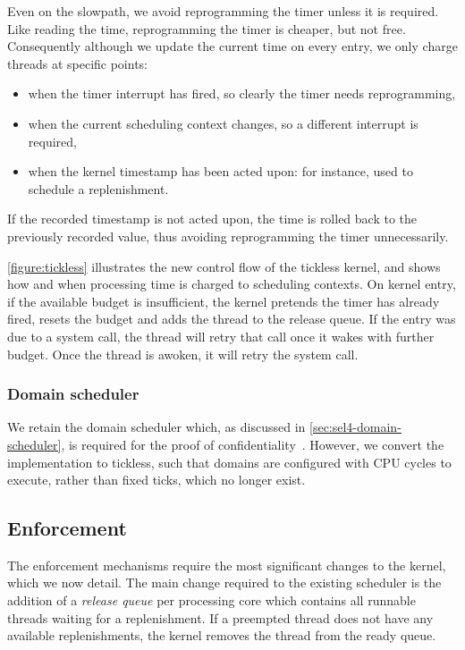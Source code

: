 Even on the slowpath, we avoid reprogramming the timer unless it is required. Like reading the time, 
reprogramming the timer is cheaper, but not free. Consequently although we update the current time
on every entry, we only charge threads at specific points:
\begin{itemize}
\item when the timer interrupt has fired, so clearly the timer needs reprogramming,
\item when the current scheduling context changes, so a different interrupt is required,
\item when the kernel timestamp has been acted upon: for instance, used to schedule a
    replenishment.
\end{itemize}
If the recorded timestamp is not acted upon, the time is rolled back to the previously recorded value,
thus avoiding reprogramming the timer unnecessarily.

\cref{figure:tickless} illustrates the new control flow of the tickless kernel, and shows
how and when processing time is charged to scheduling contexts.
On kernel entry, if the available budget is insufficient, the kernel pretends the timer has already fired,
resets the budget and adds the thread to the release queue. If the entry was due to a system call,
the thread will retry that call once it wakes with further budget.
Once the thread is awoken, it will retry the system call.

\subsubsection{Domain scheduler}

We retain the domain scheduler which, as discussed in \cref{sec:sel4-domain-scheduler}, is required
for the proof of confidentiality~\citep{Murray_MBGBSLGK_13}. However, we convert the 
implementation to tickless, such that domains are
configured with CPU cycles to execute, rather than fixed ticks, which no longer exist.

\subsection{Enforcement}

The enforcement mechanisms require the most significant changes to the kernel, which we now detail.
The main change required to the existing scheduler is the addition of a \emph{release queue} per
processing core which contains all runnable threads waiting for a replenishment. If a
preempted thread does not have any available replenishments, the kernel removes the thread from the
ready queue.

